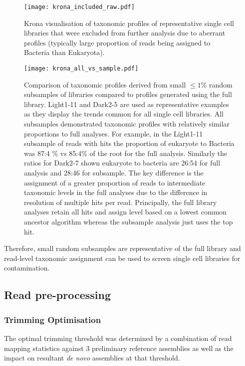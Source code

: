 \begin{figure}[h]
    \texttt{[image: krona\_included\_raw.pdf]}
    \caption{
    Krona visualisation of taxonomic profiles of representative
    single cell libraries that were excluded from further analysis due 
    to aberrant profiles (typically large proportion of reads being assigned
    to Bacteria than Eukaryota).  
    }
    \label{fig:krona_included}
\end{figure}


\begin{figure}[hp]
    \texttt{[image: krona\_all\_vs\_sample.pdf]}
    \caption{Comparison of taxonomic profiles derived from small \(\leq1\%\)
        random subsamples of libraries compared to profiles generated using the
        full library.  Light1-11 and Dark2-5 are used as representative examples
        as they display the trends common for all single cell libraries. 
        All subsamples demonstrated taxonomic profiles with relatively similar
        proportions to full analyses.  For example, in the Light1-11 subsample
        of reads with hits the proportion of eukaryote to Bacteria was 87:4 
        \% vs 85:4\% of the root for the full analysis. Similarly the ratios
        for Dark2-7 shown eukaryote to bacteria are 26:54 for full analysis
        and 28:46 for subsample. 
        The key difference is the assignment of a greater proportion of reads to 
        intermediate taxonomic levels in the full analyses due to the difference in 
        resolution of multiple hits per read.  Principally, the full library analyses
        retain all hits and assign level based on a lowest common ancestor algorithm
        whereas the subsample analysis just uses the top hit.
    }
    \label{fig:krona_sample_vs_full}
\end{figure}

Therefore, small random subsamples are representative of the full library and
read-level taxonomic assignment can be used to screen single cell libraries for contamination.


\subsection{Read pre-processing} 

\subsubsection{Trimming Optimisation}

The optimal trimming threshold was determined by a combination
of read mapping statistics against 3 preliminary reference assemblies
as well as the impact on resultant \textit{de novo} assemblies at 
that threshold.

